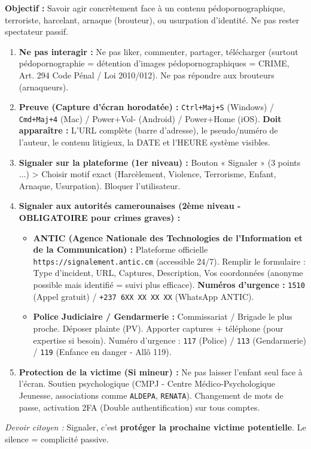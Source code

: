 \documentclass[11pt]{article}
\begin{document}
\begin{methode}
\textbf{Objectif :} Savoir agir concrètement face à un contenu pédopornographique, terroriste, harcelant, arnaque (brouteur), ou usurpation d'identité. Ne pas rester spectateur passif.
\begin{enumerate}
    \item \textbf{Ne pas interagir :} Ne pas liker, commenter, partager, télécharger (surtout pédopornographie = détention d'images pédopornographiques = CRIME, Art. 294 Code Pénal / Loi 2010/012). Ne pas répondre aux brouteurs (arnaqueurs).
    \item \textbf{Preuve (Capture d'écran horodatée) :} \texttt{Ctrl+Maj+S} (Windows) / \texttt{Cmd+Maj+4} (Mac) / Power+Vol- (Android) / Power+Home (iOS). \textbf{Doit apparaître :} L'URL complète (barre d'adresse), le pseudo/numéro de l'auteur, le contenu litigieux, la DATE et l'HEURE système visibles.
    \item \textbf{Signaler sur la plateforme (1er niveau) :} Bouton « Signaler » (3 points ...) > Choisir motif exact (Harcèlement, Violence, Terrorisme, Enfant, Arnaque, Usurpation). Bloquer l'utilisateur.
    \item \textbf{Signaler aux autorités camerounaises (2ème niveau - OBLIGATOIRE pour crimes graves) :}
    \begin{itemize}
        \item \textbf{ANTIC (Agence Nationale des Technologies de l'Information et de la Communication) :} Plateforme officielle \texttt{https://signalement.antic.cm} (accessible 24/7). Remplir le formulaire : Type d'incident, URL, Captures, Description, Vos coordonnées (anonyme possible mais identifié = suivi plus efficace). \textbf{Numéros d'urgence :} \texttt{1510} (Appel gratuit) / \texttt{+237 6XX XX XX XX} (WhatsApp ANTIC).
        \item \textbf{Police Judiciaire / Gendarmerie :} Commissariat / Brigade le plus proche. Déposer plainte (PV). Apporter captures + téléphone (pour expertise si besoin). Numéro d'urgence : \texttt{117} (Police) / \texttt{113} (Gendarmerie) / \texttt{119} (Enfance en danger - Allô 119).
    \end{itemize}
    \item \textbf{Protection de la victime (Si mineur) :} Ne pas laisser l'enfant seul face à l'écran. Soutien psychologique (CMPJ - Centre Médico-Psychologique Jeunesse, associations comme \texttt{ALDEPA}, \texttt{RENATA}). Changement de mots de passe, activation 2FA (Double authentification) sur tous comptes.
\end{enumerate}
\emph{Devoir citoyen :} Signaler, c'est \textbf{protéger la prochaine victime potentielle}. Le silence = complicité passive.
\end{methode}
\end{document}
